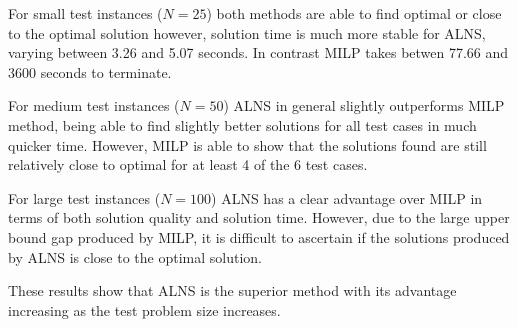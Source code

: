 For small test instances ($N=25$) both methods are able to find optimal or close to the optimal solution however, solution time is much more stable for ALNS, varying between 3.26 and 5.07 seconds. In contrast MILP takes betwen 77.66 and 3600 seconds to terminate.

For medium test instances ($N=50$) ALNS in general slightly outperforms MILP method, being able to find slightly better solutions for all test cases in  much quicker time. However, MILP is able to show that the solutions found are still relatively close to optimal for at least 4 of the 6 test cases.

For large test instances ($N=100$) ALNS has a clear advantage over MILP in terms of both solution quality and solution time. However, due to the large upper bound gap produced by MILP, it is difficult to ascertain if the solutions produced by ALNS is close to the optimal solution.

These results show that ALNS is the superior method with its advantage increasing as the test problem size increases. 


